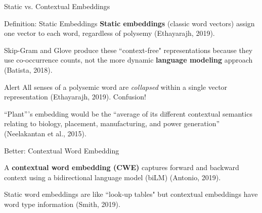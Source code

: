 \begin{frame}{Static vs. Contextual Embeddings}

    \vspace{20pt}

    \begin{definitionBlock}{\footnotesize Definition: Static Embeddings}
           \alert{\textbf{Static embeddings}} (classic word vectors) assign one vector to each word, regardless of polysemy (Ethayarajh, 2019). \newline 
           
           Skip-Gram and Glove produce these ``context-free" representations because they use co-occurrence counts, not the more dynamic \textbf{language modeling} approach (Batista, 2018). 
           
    \end{definitionBlock}
    
    
    \vspace{-2pt}
    
    \begin{alertBlock}{\footnotesize Alert}
        All senses of a polysemic word are \emph{\alert{collapsed}} within a single vector representation (Ethayarajh, 2019). Confusion!  \newline 
        
        ``Plant”'s embedding would be the ``average of its different contextual semantics relating to biology, placement, manufacturing, and power generation” (Neelakantan et al., 2015).

    
    \end{alertBlock}
    
    \vspace{-2pt}
    
    \begin{definitionBlock}{\footnotesize Better: Contextual Word Embedding}
   
    A \textbf{\alert{contextual word embedding (CWE)}} captures forward and backward context using a bidirectional language model (biLM) (Antonio, 2019).   
    
    Static word embeddings are like ``look-up tables" but contextual embeddings have word type information (Smith, 2019). 
\end{definitionBlock}
      
    
\end{frame}


